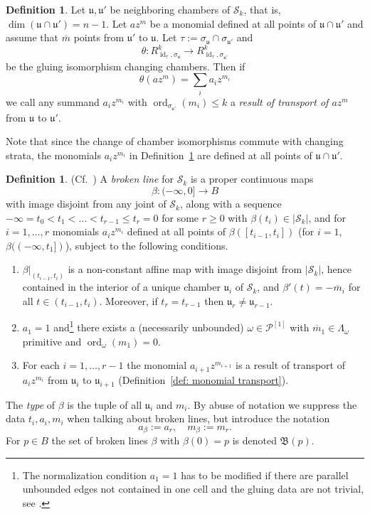 \documentclass[11pt,letter]{amsart}
\theoremstyle{definition}
\newtheorem{definition}[theorem]{Definition}
\theoremstyle{remark}
\numberwithin{equation}{section}
\numberwithin{figure}{section}
\newcommand {\foB}  {\mathfrak{B}}
\newcommand {\fou}  {\mathfrak{u}}
\newcommand {\id}  {\operatorname{id}}
\newcommand {\ord}  {\operatorname{ord}}
\renewcommand{\P}  {\mathscr{P}}
\newcommand {\scrS}  {\mathscr{S}}
\begin{document}
\begin{definition}
\label{def: monomial transport}
Let $\fou,\fou'$ be neighboring chambers of $\scrS_k$, that is,
$\dim(\fou\cap\fou') =n-1$. Let $a z^m$ be a monomial defined at all points of
$\fou\cap\fou'$ and assume that $\overline m$ points from $\fou'$ to $\fou$. Let
$\tau:= \sigma_\fou\cap \sigma_{\fou'}$ and
\[
\theta: R^k_{\id_\tau,\sigma_\fou}\to R^k_{\id_\tau,\sigma_{\fou'}}
\]
be the gluing isomorphism changing chambers. Then if
\begin{equation}
\label{eqn: transport}
\theta(az^m)=\sum_i a_iz^{m_i}
\end{equation}
we call any summand $a_i z^{m_i}$ with $\ord_{\sigma_{\fou'}}(m_i)\le k$ a
\emph{result of transport of $az^m$} from $\fou$ to $\fou'$.
\end{definition}

Note that since the change of chamber isomorphisms commute with changing strata,
the monomials $a_iz^{m_i}$ in Definition~\ref{def: monomial transport} are
defined at all points of $\fou\cap\fou'$. 

\begin{definition}
\label{def: broken lines}(Cf.\ \cite[Def.\,4.9]{PP2mirror})
A \emph{broken line} for $\scrS_k$ is a proper continuous maps
\[
\beta: (-\infty,0]\to B
\]
with image disjoint from any joint of $\scrS_k$, along with a sequence
$-\infty=t_0<t_1<\ldots< t_{r-1}\le t_r=0$ for some $r\ge 0$ with $\beta(t_i)\in
|\scrS_k|$, and for $i=1,\ldots,r$ monomials $a_i z^{m_i}$ defined at all points
of $\beta([t_{i-1},t_i])$ (for $i=1$, $\beta((-\infty,t_1])$), subject to the
following conditions.
\begin{enumerate}
\item
$\beta|_{(t_{i-1},t_i)}$ is a non-constant affine map with image disjoint from
$|\scrS_k|$, hence contained in the interior of a unique chamber $\fou_i$ of
$\scrS_k$, and $\beta'(t)=-\overline m_i$ for all $t\in (t_{i-1},t_i)$.
Moreover, if $t_r=t_{r-1}$ then $\fou_r\neq \fou_{r-1}$.
\item
$a_1=1$ and\footnote{The normalization condition $a_1=1$ has to be modified if
there are parallel unbounded edges not contained in one cell and the gluing data
are not trivial, see \cite[\S5.2]{Theta}.} there exists a (necessarily
unbounded) $\omega\in\P^{[1]}$ with $\overline m_1\in\Lambda_\omega$ primitive
and $\ord_\omega(m_1)=0$.
\item
For each $i=1,\ldots,r-1$ the monomial $a_{i+1} z^{m_{i+1}}$ is a result of
transport of $a_i z^{m_i}$ from $\fou_i$ to $\fou_{i+1}$ (Definition~\ref{def:
monomial transport}).
\end{enumerate}
The \emph{type} of $\beta$ is the tuple of all $\fou_i$ and $m_i$. By abuse of
notation we suppress the data $t_i,a_i, m_i$ when talking about broken lines,
but introduce the notation
\[
a_\beta:= a_r,\quad m_\beta:=m_r.
\]
For $p\in B$ the set of broken lines $\beta$ with $\beta(0)=p$ is denoted
$\foB(p)$.
\end{definition}
\end{document}
